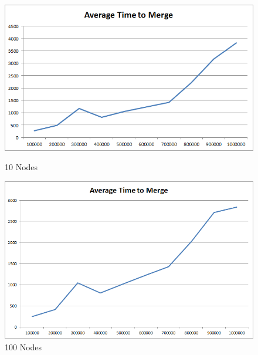 \begin{figure}[ht]
\begin{minipage}[b]{0.45\linewidth}
\centering
\includegraphics[width=\textwidth]{media/chapter5/perf/mergebignodetest_1000.png}
\caption{10 Nodes}
\label{fig:pic1}
\end{minipage}
\hspace{0.5cm}
\begin{minipage}[b]{0.45\linewidth}
\centering
\includegraphics[width=\textwidth]{media/chapter5/perf/mergebignodetest_10K.png}
\caption{100 Nodes}
\label{fig:pic2}
\end{minipage}


\end{figure}
